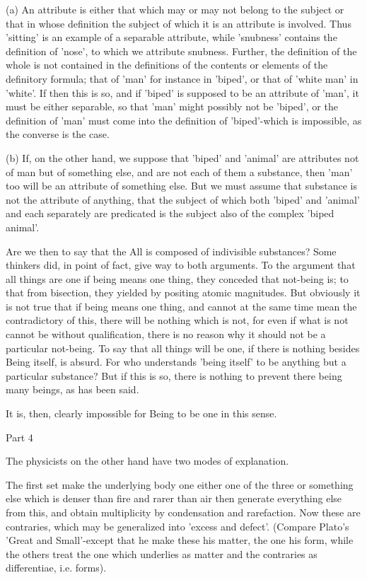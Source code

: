 (a) An attribute is either that which may or may not belong to the
subject or that in whose definition the subject of which it is an
attribute is involved. Thus 'sitting' is an example of a separable
attribute, while 'snubness' contains the definition of 'nose', to
which we attribute snubness. Further, the definition of the whole
is not contained in the definitions of the contents or elements of
the definitory formula; that of 'man' for instance in 'biped', or
that of 'white man' in 'white'. If then this is so, and if 'biped'
is supposed to be an attribute of 'man', it must be either separable,
so that 'man' might possibly not be 'biped', or the definition of
'man' must come into the definition of 'biped'-which is impossible,
as the converse is the case. 

(b) If, on the other hand, we suppose that 'biped' and 'animal' are
attributes not of man but of something else, and are not each of them
a substance, then 'man' too will be an attribute of something else.
But we must assume that substance is not the attribute of anything,
that the subject of which both 'biped' and 'animal' and each separately
are predicated is the subject also of the complex 'biped animal'.

Are we then to say that the All is composed of indivisible substances?
Some thinkers did, in point of fact, give way to both arguments. To
the argument that all things are one if being means one thing, they
conceded that not-being is; to that from bisection, they yielded by
positing atomic magnitudes. But obviously it is not true that if being
means one thing, and cannot at the same time mean the contradictory
of this, there will be nothing which is not, for even if what is not
cannot be without qualification, there is no reason why it should
not be a particular not-being. To say that all things will be one,
if there is nothing besides Being itself, is absurd. For who understands
'being itself' to be anything but a particular substance? But if this
is so, there is nothing to prevent there being many beings, as has
been said. 

It is, then, clearly impossible for Being to be one in this sense.

Part 4

The physicists on the other hand have two modes of explanation.

The first set make the underlying body one either one of the three
or something else which is denser than fire and rarer than air then
generate everything else from this, and obtain multiplicity by condensation
and rarefaction. Now these are contraries, which may be generalized
into 'excess and defect'. (Compare Plato's 'Great and Small'-except
that he make these his matter, the one his form, while the others
treat the one which underlies as matter and the contraries as differentiae,
i.e. forms). 

